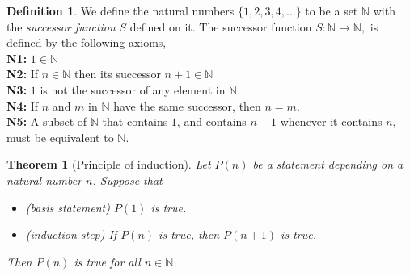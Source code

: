 \documentclass{article}
\newtheorem{theorem}{Theorem}[section]
\theoremstyle{definition}
\newtheorem{definition}{Definition}[section]
\theoremstyle{remark}
\begin{document}
\begin{definition}\label{def:natural numbers}
We define the natural numbers \( \{1, 2, 3, 4, \dots \} \) to be a set \(\mathbb{N}\) with the \textit{successor function} \(S\) defined on it. The successor function \(S:\mathbb{N} \rightarrow \mathbb{N},\) is defined by the following axioms,
\\ \indent \textbf{N1:} \( 1 \in \mathbb{N}\)
\\ \indent \textbf{N2:} If \(   n \in \mathbb{N}\) then its successor \( n+1 \in \mathbb{N}\) 
\\ \indent \textbf{N3:} \( 1\) is not the successor of any element in \(\mathbb{N}\)
\\ \indent \textbf{N4:} If \(n\) and \(m\) in \(\mathbb{N}\) have the same successor, then \(n=m\).
\\ \indent \textbf{N5:} A subset of \(\mathbb{N}\) that contains \(1\), and contains \(n+1\) whenever it contains \(n\), must be equivalent to \(\mathbb{N}\).

\end{definition}
























\begin{theorem}[Principle of induction]\label{thm:principle_of_induction}
Let \( P(n) \) be a statement depending on a natural number \( n \). Suppose that
\begin{itemize}
\item[(i)] \textit{(basis statement)} \( P(1) \) is true.
\item[(ii)] \textit{(induction step)} If \( P(n) \) is true, then \( P(n+1) \) is true.
\end{itemize}
Then \( P(n) \) is true for all \( n \in \mathbb{N} \).\\
\end{theorem}
\end{document}

